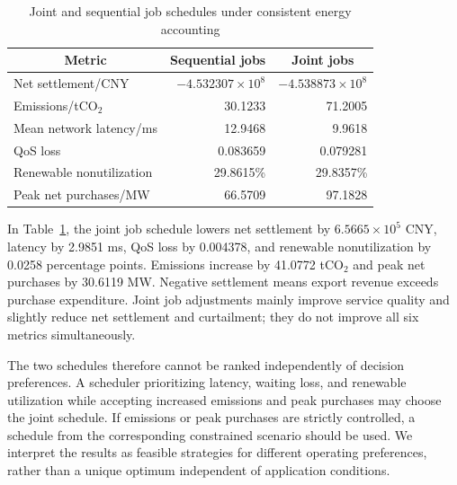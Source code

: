 \begin{table}[H]
	\centering
    \caption{Joint and sequential job schedules under consistent energy accounting}
	\label{tab:q4_result}

	\fontsize{10.5pt}{12pt}\selectfont
	\renewcommand{\arraystretch}{0.90}

	\begin{tabular}{lrr}
		\toprule
        \multicolumn{1}{c}{\textbf{Metric}}
        & \multicolumn{1}{c}{\textbf{Sequential jobs}}
        & \multicolumn{1}{c}{\textbf{Joint jobs}}\\
		\midrule

        Net settlement/CNY
		& $-4.532307\times10^8$
		& $-4.538873\times10^8$\\

        Emissions/tCO$_2$
		& 30.1233
		& 71.2005\\

        Mean network latency/ms
		& 12.9468
		& 9.9618\\

        QoS loss
		& 0.083659
		& 0.079281\\

        Renewable nonutilization
		& 29.8615\%
		& 29.8357\%\\

        Peak net purchases/MW
		& 66.5709
		& 97.1828\\

		\bottomrule
	\end{tabular}
\end{table}


In Table~\ref{tab:q4_result}, the joint job schedule lowers net settlement by $6.5665\times10^5$ CNY, latency by 2.9851 ms, QoS loss by 0.004378, and renewable nonutilization by 0.0258 percentage points. Emissions increase by 41.0772 tCO$_2$ and peak net purchases by 30.6119 MW. Negative settlement means export revenue exceeds purchase expenditure. Joint job adjustments mainly improve service quality and slightly reduce net settlement and curtailment; they do not improve all six metrics simultaneously.

The two schedules therefore cannot be ranked independently of decision preferences. A scheduler prioritizing latency, waiting loss, and renewable utilization while accepting increased emissions and peak purchases may choose the joint schedule. If emissions or peak purchases are strictly controlled, a schedule from the corresponding constrained scenario should be used. We interpret the results as feasible strategies for different operating preferences, rather than a unique optimum independent of application conditions.

